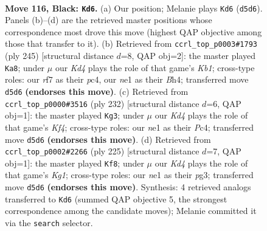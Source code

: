 \documentclass[11pt]{article}
\begin{document}
\clearpage

\begin{figure}[p]\centering
\begin{subfigure}{0.46\textwidth}\centering
\resizebox{\linewidth}{!}{%
\newchessgame
\chessboard[
  setfen={8/5R2/8/3k2K1/6P1/1r6/8/4N3 b - - 16 116},
  showmover=false,
  pgfstyle=straightmove, color=movearrow, markmove={d5-d6}
]}
\caption{}
\end{subfigure}\hfill
\begin{subfigure}{0.46\textwidth}\centering
\resizebox{\linewidth}{!}{%
\newchessgame
\chessboard[
  setfen={1k6/8/K7/P7/2P4b/7B/8/8 b - - 8 123},
  showmover=false,
  pgfstyle=straightmove, color=movearrow, markmove={b8-a8}
]}
\caption{}
\end{subfigure}
\\[4pt]
\begin{subfigure}{0.46\textwidth}\centering
\resizebox{\linewidth}{!}{%
\newchessgame
\chessboard[
  setfen={8/7R/1k6/2p5/2P2K2/8/r7/8 w - - 19 117},
  showmover=false,
  pgfstyle=straightmove, color=movearrow, markmove={f4-g3}
]}
\caption{}
\end{subfigure}\hfill
\begin{subfigure}{0.46\textwidth}\centering
\resizebox{\linewidth}{!}{%
\newchessgame
\chessboard[
  setfen={6k1/1R6/r7/6PK/8/6P1/8/8 b - - 22 113},
  showmover=false,
  pgfstyle=straightmove, color=movearrow, markmove={g8-f8}
]}
\caption{}
\end{subfigure}
\caption{\textbf{Move 116, Black: \texttt{Kd6}.} (a) Our position; Melanie plays \texttt{Kd6} (\texttt{d5d6}). Panels (b)--(d) are the retrieved master positions whose correspondence most drove this move (highest QAP objective among those that transfer to it). (b) Retrieved from \texttt{ccrl\_top\_p0003\#1793} (ply 245) [structural distance $d$=8, QAP obj=2]: the master played \texttt{Ka8}; under $\mu$ our \emph{Kd4} plays the role of that game's \emph{Kb1}; cross-type roles: our \emph{r}f7 as their \emph{p}c4, our \emph{n}e1 as their \emph{B}h4; transferred move \texttt{d5d6} \textbf{(endorses this move)}. (c) Retrieved from \texttt{ccrl\_top\_p0000\#3516} (ply 232) [structural distance $d$=6, QAP obj=1]: the master played \texttt{Kg3}; under $\mu$ our \emph{Kd4} plays the role of that game's \emph{Kf4}; cross-type roles: our \emph{n}e1 as their \emph{P}c4; transferred move \texttt{d5d6} \textbf{(endorses this move)}. (d) Retrieved from \texttt{ccrl\_top\_p0002\#2266} (ply 225) [structural distance $d$=7, QAP obj=1]: the master played \texttt{Kf8}; under $\mu$ our \emph{Kd4} plays the role of that game's \emph{Kg1}; cross-type roles: our \emph{n}e1 as their \emph{p}g3; transferred move \texttt{d5d6} \textbf{(endorses this move)}. Synthesis: 4 retrieved analogs transferred to \texttt{Kd6} (summed QAP objective 5, the strongest correspondence among the candidate moves); Melanie committed it via the \texttt{search} selector.}
\label{fig:thought-m231}
\end{figure}
\end{document}
